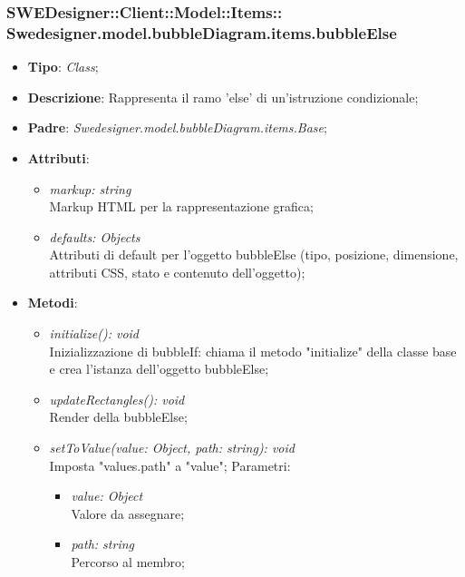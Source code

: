 \documentclass[../DefinizioneDiProdotto.tex]{subfiles}
\begin{document}
			\subsubsection[Swedesigner.model.bubbleDiagram.items.bubbleElse]{SWEDesigner::Client::Model::Items::\\Swedesigner.model.bubbleDiagram.items.bubbleElse}
			\hypertarget{SWEDesigner::Client::Model::Items::Swedesigner.model.bubbleDiagram.items.bubbleElse}{}
			\begin{itemize}
				\item \textbf{Tipo}: \emph{Class};
				\item \textbf{Descrizione}: Rappresenta il ramo 'else' di un'istruzione condizionale;
				\item \textbf{Padre}: \emph{Swedesigner.model.bubbleDiagram.items.Base};
				\item \textbf{Attributi}:
				\begin{itemize}
					\item \emph{markup: string}\\
					Markup HTML per la rappresentazione grafica;
					\item \emph{defaults: Objects}\\
					Attributi di default per l'oggetto bubbleElse (tipo, posizione, dimensione, attributi CSS, stato e contenuto dell'oggetto);
				\end{itemize}
				\item \textbf{Metodi}:
				\begin{itemize}
					\item \emph{initialize(): void}\\
					Inizializzazione di bubbleIf: chiama il metodo "initialize" della classe base e crea l'istanza dell'oggetto bubbleElse;
					\item \emph{updateRectangles(): void}\\
					Render della bubbleElse;
					\item \emph{setToValue(value: Object, path: string): void}\\
					Imposta "values.path" a "value";
					Parametri:
					\begin{itemize}
						\item \emph{value: Object} \\
						Valore da assegnare;
						\item \emph{path: string} \\
						Percorso al membro;
					\end{itemize}
				\end{itemize}
			\end{itemize}
			
\end{document}
